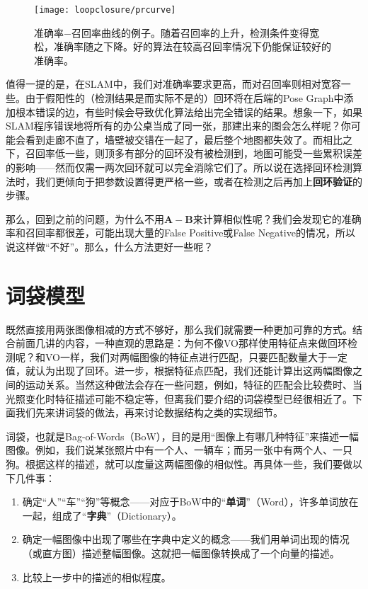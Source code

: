 \begin{figure}[!ht]
	\centering
	\texttt{[image: loopclosure/prcurve]}
	\caption{准确率−召回率曲线的例子\textsuperscript{\cite{Gao2015a}}。随着召回率的上升，检测条件变得宽松，准确率随之下降。好的算法在较高召回率情况下仍能保证较好的准确率。}
	\label{fig:PRCurve}
\end{figure}

值得一提的是，在SLAM中，我们对准确率要求更高，而对召回率则相对宽容一些。由于假阳性的（检测结果是而实际不是的）回环将在后端的Pose  Graph中添加根本错误的边，有些时候会导致优化算法给出完全错误的结果。想象一下，如果SLAM程序错误地将所有的办公桌当成了同一张，那建出来的图会怎么样呢？你可能会看到走廊不直了，墙壁被交错在一起了，最后整个地图都失效了。而相比之下，召回率低一些，则顶多有部分的回环没有被检测到，地图可能受一些累积误差的影响——然而仅需一两次回环就可以完全消除它们了。所以说在选择回环检测算法时，我们更倾向于把参数设置得更严格一些，或者在检测之后再加上\textbf{回环验证}的步骤。

那么，回到之前的问题，为什么不用$\bm{A}-\bm{B}$来计算相似性呢？我们会发现它的准确率和召回率都很差，可能出现大量的False Positive或False Negative的情况，所以说这样做“不好”。那么，什么方法更好一些呢？

\section{词袋模型}
既然直接用两张图像相减的方式不够好，那么我们就需要一种更加可靠的方式。结合前面几讲的内容，一种直观的思路是：为何不像VO那样使用特征点来做回环检测呢？和VO一样，我们对两幅图像的特征点进行匹配，只要匹配数量大于一定值，就认为出现了回环。进一步，根据特征点匹配，我们还能计算出这两幅图像之间的运动关系。当然这种做法会存在一些问题，例如，特征的匹配会比较费时、当光照变化时特征描述可能不稳定等，但离我们要介绍的词袋模型已经很相近了。下面我们先来讲词袋的做法，再来讨论数据结构之类的实现细节。

词袋，也就是Bag-of-Words（BoW），目的是用“图像上有哪几种特征”来描述一幅图像。例如，我们说某张照片中有一个人、一辆车；而另一张中有两个人、一只狗。根据这样的描述，就可以度量这两幅图像的相似性。再具体一些，我们要做以下几件事：

\begin{enumerate}
	\item 确定“人”“车”“狗”等概念——对应于BoW中的“\textbf{单词}”（Word），许多单词放在一起，组成了“\textbf{字典}”（Dictionary）。
\clearpage
	\item 确定一幅图像中出现了哪些在字典中定义的概念——我们用单词出现的情况（或直方图）描述整幅图像。这就把一幅图像转换成了一个向量的描述。
	\item 比较上一步中的描述的相似程度。
\end{enumerate}

